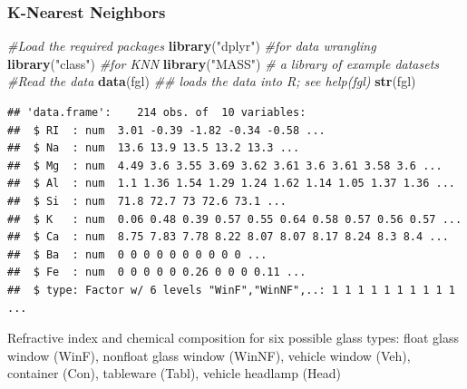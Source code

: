 \documentclass[
  shownotes,
  xcolor={svgnames},
  hyperref={colorlinks,citecolor=DarkBlue,linkcolor=DarkRed,urlcolor=DarkBlue}
  , aspectratio=169]{beamer}
\newenvironment{Shaded}{\begin{snugshade}}{\end{snugshade}}
\newcommand{\CommentTok}[1]{\textcolor[rgb]{0.56,0.35,0.01}{\textit{#1}}}
\newcommand{\KeywordTok}[1]{\textcolor[rgb]{0.13,0.29,0.53}{\textbf{#1}}}
\newcommand{\NormalTok}[1]{#1}
\newcommand{\StringTok}[1]{\textcolor[rgb]{0.31,0.60,0.02}{#1}}
\begin{document}
\begin{frame}[fragile]
\frametitle{K-Nearest Neighbors}

\begin{scriptsize}
\begin{Shaded}
\begin{Highlighting}[]
\CommentTok{\#Load the required packages}
\KeywordTok{library}\NormalTok{(}\StringTok{"dplyr"}\NormalTok{) }\CommentTok{\#for data wrangling}
\KeywordTok{library}\NormalTok{(}\StringTok{"class"}\NormalTok{) }\CommentTok{\#for KNN}
\KeywordTok{library}\NormalTok{(}\StringTok{"MASS"}\NormalTok{) }\CommentTok{\# a library of example datasets}
\CommentTok{\#Read the data}
\KeywordTok{data}\NormalTok{(fgl) }\CommentTok{\#\# loads the data into R; see help(fgl)}
\KeywordTok{str}\NormalTok{(fgl)}
\end{Highlighting}
\end{Shaded}
\end{scriptsize}

\begin{tiny}
\begin{verbatim}
## 'data.frame':    214 obs. of  10 variables:
##  $ RI  : num  3.01 -0.39 -1.82 -0.34 -0.58 ...
##  $ Na  : num  13.6 13.9 13.5 13.2 13.3 ...
##  $ Mg  : num  4.49 3.6 3.55 3.69 3.62 3.61 3.6 3.61 3.58 3.6 ...
##  $ Al  : num  1.1 1.36 1.54 1.29 1.24 1.62 1.14 1.05 1.37 1.36 ...
##  $ Si  : num  71.8 72.7 73 72.6 73.1 ...
##  $ K   : num  0.06 0.48 0.39 0.57 0.55 0.64 0.58 0.57 0.56 0.57 ...
##  $ Ca  : num  8.75 7.83 7.78 8.22 8.07 8.07 8.17 8.24 8.3 8.4 ...
##  $ Ba  : num  0 0 0 0 0 0 0 0 0 0 ...
##  $ Fe  : num  0 0 0 0 0 0.26 0 0 0 0.11 ...
##  $ type: Factor w/ 6 levels "WinF","WinNF",..: 1 1 1 1 1 1 1 1 1 1 ...
\end{verbatim}
\end{tiny}
\begin{tiny}
Refractive index and chemical composition for six possible glass types: float glass window (WinF), nonfloat glass window (WinNF), vehicle window (Veh), container (Con), tableware (Tabl), vehicle headlamp (Head)
\end{tiny}



\end{frame}
\end{document}
